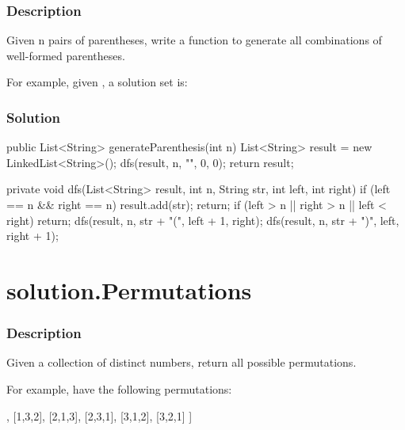 \subsubsection{Description}
Given n pairs of parentheses, write a function to generate all combinations of well-formed parentheses.

For example, given , a solution set is:
\begin{Code}
[
  "((()))",
  "(()())",
  "(())()",
  "()(())",
  "()()()"
]
\end{Code}

\subsubsection{Solution}

\begin{Code}
public List<String> generateParenthesis(int n) {
    List<String> result = new LinkedList<String>();
    dfs(result, n, "", 0, 0);
    return result;
}

private void dfs(List<String> result, int n, String str, int left, int right) {
    if (left == n && right == n) {
        result.add(str);
        return;
    }
    if (left > n || right > n || left < right) {
        return;
    }
    dfs(result, n, str + "(", left + 1, right);
    dfs(result, n, str + ")", left, right + 1);
}
\end{Code}

\newpage

\section{solution.Permutations} %

\subsubsection{Description}
Given a collection of distinct numbers, return all possible permutations.

For example, \code{[1,2,3]} have the following permutations:
\begin{Code}
[
  [1,2,3],
  [1,3,2],
  [2,1,3],
  [2,3,1],
  [3,1,2],
  [3,2,1]
]
\end{Code}

